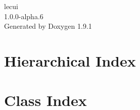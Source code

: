 \let\mypdfximage\pdfximage\def\pdfximage{\immediate\mypdfximage}\documentclass[twoside]{book}
\newcommand{\+}{\discretionary{\mbox{\scriptsize$\hookleftarrow$}}{}{}}
\newcommand{\clearemptydoublepage}{%
  \newpage{\pagestyle{empty}\cleardoublepage}%
}
\begin{document}
\raggedbottom

\hypersetup{pageanchor=false,
             bookmarksnumbered=true,
             pdfencoding=unicode
            }
\begin{titlepage}
\vspace*{7cm}
\begin{center}%
{\Large lecui \\[1ex]\large 1.\+0.\+0-\/alpha.\+6 }\\
\vspace*{1cm}
{\large Generated by Doxygen 1.9.1}\\
\end{center}
\end{titlepage}
\clearemptydoublepage
{}
\tableofcontents
\clearemptydoublepage
{}
\hypersetup{pageanchor=true}

\chapter{Hierarchical Index}

\chapter{Class Index}

\end{document}
